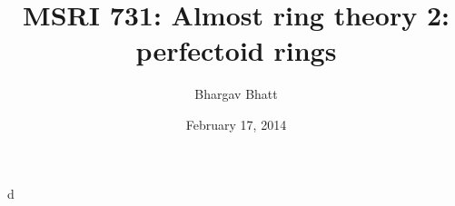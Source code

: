 \documentclass{article}
\title{MSRI 731: Almost ring theory 2: perfectoid rings}
\author{Bhargav Bhatt}
\date{February 17, 2014}
\begin{document}
\maketitle





d
\end{document}
